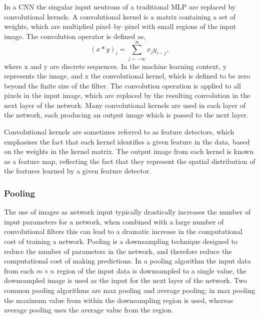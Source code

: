 In a CNN the singular input neutrons of a traditional MLP are replaced by
convolutional kernels. A convolutional kernel is a matrix containing a set of 
weights, which are multiplied pixel--by--pixel with small regions of the input 
image. The convolution operator is defined as, 
\begin{equation}
	\left( x * y \right)_i = \sum_{j = - \infty}^{\infty} x_j y_{i-j},
\end{equation}
where x and y are discrete sequences. In the machine learning context, y
represents the image, and x the convolutional kernel, which is defined to be
zero beyond the finite size of the filter. The convolution operation is applied
to all pixels in the input image, which are replaced by the resulting 
convolution in the next layer of the network. Many convolutional kernels are 
used in each layer of the network, each producing an output image which is 
passed to the next layer. 

Convolutional kernels are sometimes referred to as feature detectors, which 
emphasises the fact that each kernel identifies a given feature in the data, 
based on the weights in the kernel matrix. The output image from each kernel 
is known as a feature map, reflecting the fact that they represent the spatial 
distribution of the features learned by a given feature detector. 

\subsubsection*{Pooling}
The use of images as network input typically drastically increases the number of
input parameters for a network, when combined with a large number of
convolutional filters this can lead to a dramatic increase in the computational
cost of training a network. Pooling \cite{5537907} is a downsampling technique 
designed to reduce the number of parameters in the network, and therefore 
reduce the computational cost of making predictions. In a pooling algorithm 
the input data from each $m \times n$ region of the input data is downsampled 
to a single value, the downsampled image is used as the input for the next 
layer of the network. Two common pooling algorithms are max pooling and 
average pooling; in max pooling the maximum value from within the downsampling 
region is used, whereas average pooling uses the average value from the region.

\bigskip

